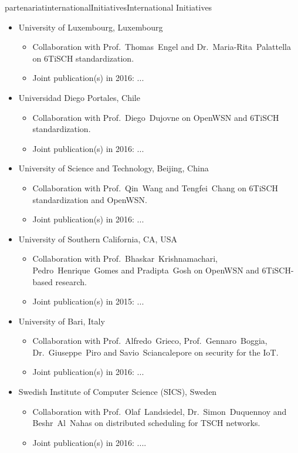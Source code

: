 \documentclass{ra2016}
\begin{document}
\begin{module}{partenariat}{internationalInitiatives}{International Initiatives}
\begin{itemize}
    \item University of Luxembourg, Luxembourg
        \begin{itemize}
            \item Collaboration with Prof.~Thomas~Engel and Dr.~Maria-Rita~Palattella on 6TiSCH standardization.
            \item Joint publication(s) in 2016: ...
        \end{itemize}
    
    \item Universidad Diego Portales, Chile
        \begin{itemize}
            \item Collaboration with Prof.~Diego~Dujovne on OpenWSN and 6TiSCH standardization.
            \item Joint publication(s) in 2016: ...
        \end{itemize}
    
    \item University of Science and Technology, Beijing, China
        \begin{itemize}
            \item Collaboration with Prof.~Qin~Wang and Tengfei~Chang on 6TiSCH standardization and OpenWSN.
            \item Joint publication(s) in 2016: ...
        \end{itemize}
    
    \item University of Southern California, CA, USA
        \begin{itemize}
            \item Collaboration with Prof.~Bhaskar~Krishnamachari, Pedro~Henrique~Gomes and Pradipta~Gosh on OpenWSN and 6TiSCH-based research.
            \item Joint publication(s) in 2015: ...
        \end{itemize}
    
    \item University of Bari, Italy
        \begin{itemize}
            \item Collaboration with Prof.~Alfredo~Grieco, Prof.~Gennaro~Boggia, Dr.~Giuseppe~Piro and Savio~Sciancalepore on security for the IoT.
            \item Joint publication(s) in 2016: ...
        \end{itemize}
    
    \item Swedish Institute of Computer Science (SICS), Sweden
        \begin{itemize}
            \item Collaboration with Prof.~Olaf~Landsiedel, Dr.~Simon~Duquennoy and Beshr~Al~Nahas on distributed scheduling for TSCH networks.
            \item Joint publication(s) in 2016: ....
        \end{itemize}
    

\end{itemize}
\end{module}
\end{document}
